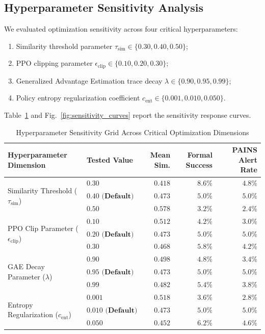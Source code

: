 \documentclass{ieeeaccess}
\begin{document}
\subsection{Hyperparameter Sensitivity Analysis}
We evaluated optimization sensitivity across four critical hyperparameters:
\begin{enumerate}
    \item Similarity threshold parameter $\tau_{\text{sim}} \in \{0.30, 0.40, 0.50\}$;
    \item PPO clipping parameter $\epsilon_{\text{clip}} \in \{0.10, 0.20, 0.30\}$;
    \item Generalized Advantage Estimation trace decay $\lambda \in \{0.90, 0.95, 0.99\}$;
    \item Policy entropy regularization coefficient $c_{\text{ent}} \in \{0.001, 0.010, 0.050\}$.
\end{enumerate}

Table~\ref{tab:sensitivity_grid} and Fig.~\ref{fig:sensitivity_curves} report the sensitivity response curves.

\begin{table}[!tbp]
\caption{Hyperparameter Sensitivity Grid Across Critical Optimization Dimensions}
\label{tab:sensitivity_grid}
\centering
\footnotesize
\begin{tabularx}{\columnwidth}{l l r r r}
\toprule
\textbf{Hyperparameter Dimension} & \textbf{Tested Value} & \textbf{Mean Sim.} & \textbf{Formal Success} & \textbf{PAINS Alert Rate}\\
\midrule
\multirow{3}{*}{Similarity Threshold ($\tau_{\text{sim}}$)} & $0.30$ & $0.418$ & $8.6\%$ & $4.8\%$\\
 & $\mathbf{0.40\text{ (Default)}}$ & $\mathbf{0.473}$ & $\mathbf{5.0\%}$ & $\mathbf{5.0\%}$\\
 & $0.50$ & $0.578$ & $3.2\%$ & $2.4\%$\\
\midrule
\multirow{3}{*}{PPO Clip Parameter ($\epsilon_{\text{clip}}$)} & $0.10$ & $0.512$ & $4.2\%$ & $3.0\%$\\
 & $\mathbf{0.20\text{ (Default)}}$ & $\mathbf{0.473}$ & $\mathbf{5.0\%}$ & $\mathbf{5.0\%}$\\
 & $0.30$ & $0.468$ & $5.8\%$ & $4.2\%$\\
\midrule
\multirow{3}{*}{GAE Decay Parameter ($\lambda$)} & $0.90$ & $0.498$ & $4.8\%$ & $3.4\%$\\
 & $\mathbf{0.95\text{ (Default)}}$ & $\mathbf{0.473}$ & $\mathbf{5.0\%}$ & $\mathbf{5.0\%}$\\
 & $0.99$ & $0.482$ & $5.4\%$ & $3.8\%$\\
\midrule
\multirow{3}{*}{Entropy Regularization ($c_{\text{ent}}$)} & $0.001$ & $0.518$ & $3.6\%$ & $2.8\%$\\
 & $\mathbf{0.010\text{ (Default)}}$ & $\mathbf{0.473}$ & $\mathbf{5.0\%}$ & $\mathbf{5.0\%}$\\
 & $0.050$ & $0.452$ & $6.2\%$ & $4.6\%$\\
\bottomrule
\end{tabularx}
\end{table}
\end{document}
